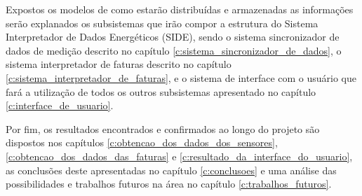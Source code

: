 Expostos os modelos de como estarão distribuídas e armazenadas as informações serão explanados os subsistemas que irão compor a estrutura do Sistema Interpretador de Dados Energéticos (SIDE), sendo o sistema sincronizador de dados de medição descrito no capítulo \ref{c:sistema_sincronizador_de_dados}, o sistema interpretador de faturas descrito no capítulo \ref{c:sistema_interpretador_de_faturas}, e o sistema de interface com o usuário que fará a utilização de todos os outros subsistemas apresentado no capítulo \ref{c:interface_de_usuario}.

Por fim, os resultados encontrados e confirmados ao longo do projeto são dispostos nos capítulos \ref{c:obtencao_dos_dados_dos_sensores}, \ref{c:obtencao_dos_dados_das_faturas} e \ref{c:resultado_da_interface_do_usuario}, as conclusões deste apresentadas no capítulo \ref{c:conclusoes} e uma análise das possibilidades e trabalhos futuros na área no capítulo \ref{c:trabalhos_futuros}.

